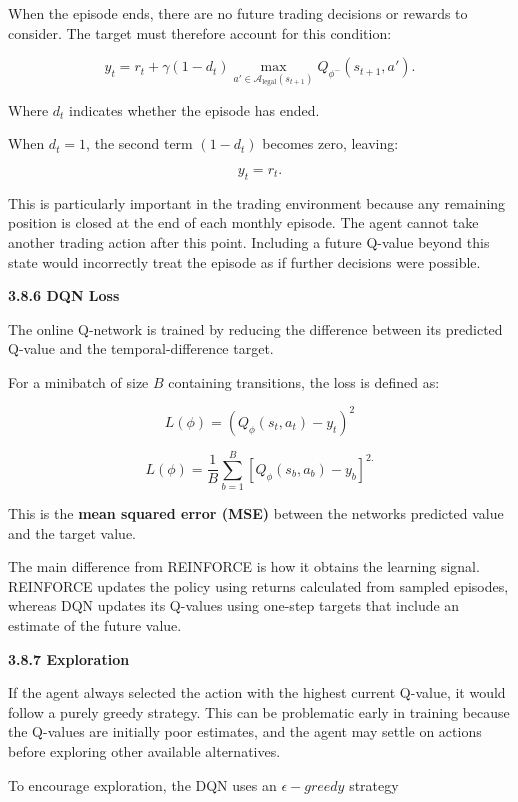 When the episode ends, there are no future trading decisions or rewards
to consider. The target must therefore account for this condition:

\[y_{t} = r_{t} + \gamma\left( 1 - d_{t} \right)\max_{a' \in \mathcal{A}_{\text{legal}}\left( s_{t + 1} \right)}{Q_{\phi^{-}}\left( s_{t + 1},a' \right)}.\]

Where \(d_{t}\) indicates whether the episode has ended.

When \(d_{t} = 1\), the second term \(\left( 1 - d_{t} \right)\) becomes
zero, leaving:

\[y_{t} = r_{t}.\]

This is particularly important in the trading environment because any
remaining position is closed at the end of each monthly episode. The
agent cannot take another trading action after this point. Including a
future Q-value beyond this state would incorrectly treat the episode as
if further decisions were possible.

\textbf{3.8.6 DQN Loss}

The online Q-network is trained by reducing the difference between its
predicted Q-value and the temporal-difference target.

For a minibatch of size \(B\) containing transitions, the loss is
defined as:

\[L(\phi) = \left( Q_{\phi}\left( s_{t},a_{t} \right) - y_{t} \right)^{2}\]

\[L(\phi) = \frac{1}{B}\sum_{b = 1}^{B}\left\lbrack Q_{\phi}\left( s_{b},a_{b} \right) - y_{b} \right\rbrack^{2.}\]

This is the \textbf{mean squared error (MSE)} between the
network\textquotesingle s predicted value and the target value.

The main difference from REINFORCE is how it obtains the learning
signal. REINFORCE updates the policy using returns calculated from
sampled episodes, whereas DQN updates its Q-values using one-step
targets that include an estimate of the future value.

\textbf{3.8.7 Exploration}

If the agent always selected the action with the highest current
Q-value, it would follow a purely greedy strategy. This can be
problematic early in training because the Q-values are initially poor
estimates, and the agent may settle on actions before exploring other
available alternatives.

To encourage exploration, the DQN uses an \(\epsilon - greedy\) strategy

